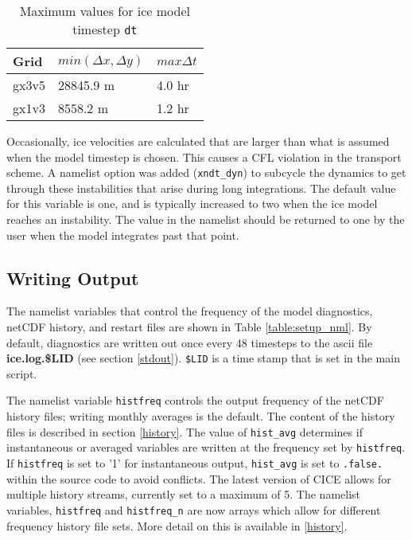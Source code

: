 \begin{table}
  \begin{center}
  \caption{Maximum values for ice model timestep {\tt dt}}
  \label{table:max_dt}
  \begin{tabular}{lll} \hline
  Grid & $min(\Delta x, \Delta y)$ & $max \Delta t$   \\
  \hline \hline

gx3v5   & 28845.9 m & 4.0 hr \\
gx1v3   &  8558.2 m & 1.2 hr \\

  \hline
  \end{tabular}
  \end{center}
\end{table}

Occasionally, ice velocities are calculated that are larger than what is
assumed when the model timestep is chosen.  This causes a CFL violation
in the transport scheme.  A namelist option was added ({\tt xndt\_dyn})
to subcycle the dynamics to get through these instabilities that arise
during long integrations.  The default value for this variable is one,
and is typically increased to two when the ice model reaches an instability.
The value in the namelist should be returned to one by the user when the
model integrates past that point.

\subsection{Writing Output}

The namelist variables that control the frequency of the model diagnostics, 
netCDF history, and restart files are shown in Table \ref{table:setup_nml}.  By 
default, diagnostics are written out once every 48 timesteps to the ascii file
{\bf ice.log.\$LID} (see section \ref{stdout}). {\tt \$LID} is a time stamp 
that is set in the main script.   

The namelist variable {\tt histfreq} controls the output frequency of the 
netCDF history files; writing monthly averages is the default.  The content of 
the history files is described in section \ref{history}.  The value of 
{\tt hist\_avg} determines if instantaneous or averaged variables are written 
at the frequency set by {\tt histfreq}.  If {\tt histfreq} is set to '1' for 
instantaneous output, {\tt hist\_avg} is set to {\tt .false.} within the source 
code to avoid conflicts.  The latest version of CICE allows for multiple
history streams, currently set to a maximum of 5.  The namelist variables, 
{\tt histfreq} and {\tt histfreq\_n} are now arrays which allow for different
frequency history file sets.  More detail on this is available in \ref{history}.

